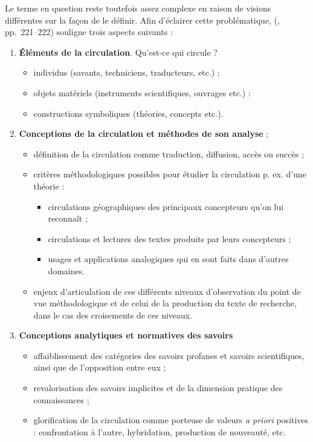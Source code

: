 Le terme en question reste toutefois assez complexe en raison de visions différentes sur la façon de le définir. Afin d'éclairer cette problématique, \citeauthor{quet2014frederic} (\citeyear{quet2014frederic}, pp.~221--222) souligne trois aspects suivants :
\begin{enumerate}
    \item \textbf{Éléments de la circulation}. Qu'est-ce qui circule ? 
    \begin{itemize}
        \item individus (savants, techniciens, traducteurs, etc.) ;
        \item objets matériels (instruments scientifiques, ouvrages etc.) :
        \item constructions symboliques (théories, concepts etc.).
    \end{itemize}  
    \item \textbf{Conceptions de la circulation et méthodes de son analyse} ;
    \begin{itemize}
        \item définition de la circulation comme \og{}traduction\fg{}, \og{}diffusion\fg{}, \og{}accès\fg{} ou \og{}succès\fg{} ;
        \item critères méthodologiques possibles pour étudier la circulation p. ex. d'une théorie : 
        \begin{itemize}
            \item circulations géographiques des principaux concepteurs qu'on lui reconnaît ;
            \item circulations et lectures des textes produits par leurs concepteurs ;
            \item usages et applications analogiques qui en sont faits dans d'autres domaines.
        \end{itemize} 
        \item enjeux d'articulation de ces différents niveaux d'observation du point de vue méthodologique et de celui de la production du texte de recherche, dans le cas des croisements de ces niveaux.
    \end{itemize}
    \item \textbf{Conceptions analytiques et normatives des savoirs}
    \begin{itemize}
        \item affaiblissement des catégories des \og{}savoirs profanes\fg{} et \og{}savoirs scientifiques\fg{}, ainsi que de l'opposition entre eux ;
        \item revalorisation des savoirs implicites et de la dimension pratique des connaissances ;
        \item glorification de la circulation comme porteuse de valeurs \textit{a priori} positives : confrontation à l'autre, hybridation, production de nouveauté, etc.
    \end{itemize}
\end{enumerate}

